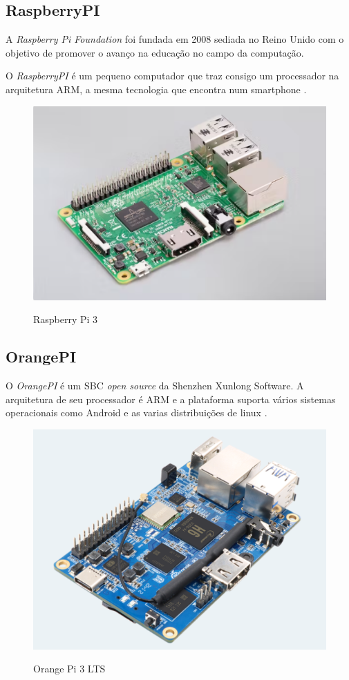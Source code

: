 \subsection{RaspberryPI}

A \textit{Raspberry Pi Foundation} foi fundada em 2008 sediada no Reino Unido com o objetivo de promover o avanço na educação no campo da computação. \cite{rasp}

O \textit{RaspberryPI} é um pequeno computador que traz consigo um processador na arquitetura ARM, a mesma tecnologia que encontra num smartphone \cite{rasp}.

\begin{figure}[!htbp]
  \caption{Raspberry Pi 3}
  \includegraphics[scale=0.4]{images/rasp.png}
  \label{figura:rasp}
\end{figure}

\subsection{OrangePI}

O \textit{OrangePI} é um SBC \textit{open source} da Shenzhen Xunlong Software. A arquitetura de seu processador é ARM e a plataforma suporta vários sistemas operacionais como Android e as varias distribuições de linux \cite{orangepi}.

\begin{figure}[!htbp]
  \caption{Orange Pi 3 LTS}
  \includegraphics[scale=0.4]{images/orange.png}
  \label{figura:orange}
\end{figure}

